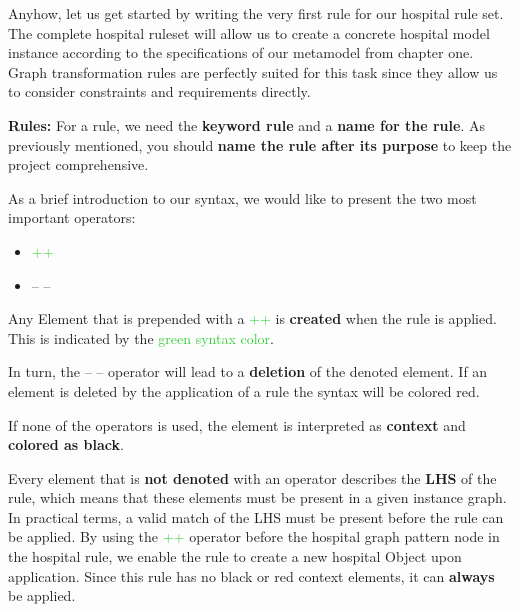Anyhow, let us get started by writing the very first rule for our hospital rule set. The complete hospital ruleset will allow us to create a concrete hospital model instance according to the specifications of our metamodel from chapter one. Graph transformation rules are perfectly suited for this task since they allow us to consider constraints and requirements directly.\newline

\textbf{Rules:}\newline
For a rule, we need the \textbf{keyword rule} and a \textbf{name for the rule}. As previously mentioned, you should \textbf{name the rule after its purpose} to keep the project comprehensive.\newline

As a brief introduction to our syntax, we would like to present the two most important operators:

\begin{itemize}
    \item \textcolor{LimeGreen}{++} 
    \item {\color{red} -- -- }
\end{itemize}
Any Element that is prepended with a \textcolor{LimeGreen}{ ++} is \textbf{created} when the rule is applied. This is indicated by the \textcolor{LimeGreen}{ green syntax color}.\newline

In turn, the {\color{red} -- -- } operator will lead to a \textbf{deletion} of the denoted element. If an element is deleted by the application of a rule the {\color{red}syntax will be colored red}. \newline

If none of the operators is used, the element is interpreted as \textbf{context} and \textbf{colored as black}.\newline

Every element that is \textbf{not denoted} with an operator describes the \textbf{LHS} of the rule, which means that these elements must be present in a given instance graph.\newline
In practical terms, a valid match of the LHS must be present before the rule can be applied.\newline
By using the \textcolor{LimeGreen}{++} operator before the hospital graph pattern node in the hospital rule, we enable the rule to create a new hospital Object upon application. Since this rule has no black or red context elements, it can \textbf{always} be applied. \newline

